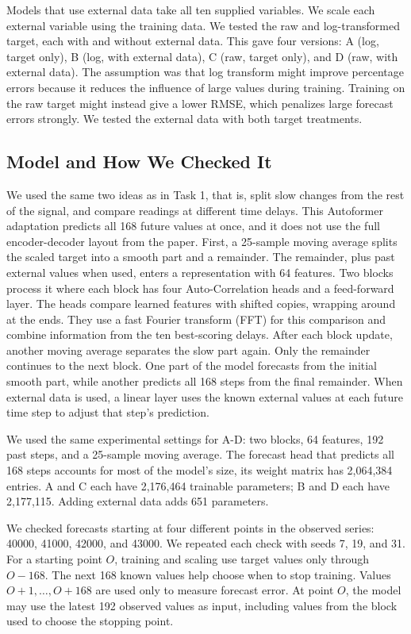 \documentclass[11pt,a4paper]{article}
\begin{document}
Models that use external data take all ten supplied variables. We scale each external variable using
the training data. We tested the raw and log-transformed target, each with and without external data.
This gave four versions: A (log, target only), B (log, with external data), C (raw, target only),
and D (raw, with external data). The assumption was that log transform might improve
percentage errors because it reduces the influence of large values during
training. Training on the raw target might instead give a lower RMSE, which
penalizes large forecast errors strongly. We tested the external data with
both target treatments.

\subsection*{Model and How We Checked It}

We used the same two ideas as in Task 1, that is, split slow changes from the rest of
the signal, and compare readings at different time delays. This Autoformer
adaptation predicts all 168 future values at once, and it does not use the full
encoder-decoder layout from the paper. First, a 25-sample moving average
splits the scaled target into a smooth part and a remainder. The remainder,
plus past external values when used, enters a representation with 64 features.
Two blocks process it where each block has four Auto-Correlation heads and a
feed-forward layer. The heads compare learned features with shifted copies,
wrapping around at the ends. They use a fast Fourier transform (FFT) for this
comparison and combine information from the ten best-scoring delays. After
each block update, another moving average separates the slow part again. Only
the remainder continues to the next block. One part of the model forecasts
from the initial smooth part, while another predicts all 168 steps from the
final remainder. When external data is used, a linear layer uses the known external 
values at each future time step to adjust that step’s prediction.

We used the same experimental settings for A-D: two blocks, 64 features, 192
past steps, and a 25-sample moving average. The forecast head that predicts all 168 steps 
accounts for most of the model's size, its weight matrix has 2,064,384 entries. A and C each have
2,176,464 trainable parameters; B and D each have 2,177,115. Adding external
data adds 651 parameters. 

We checked forecasts starting at four different points in the observed series: 40000,
41000, 42000, and 43000. We repeated each check with seeds 7, 19, and 31.
For a starting point $O$, training and scaling use target values only through
$O-168$. The next 168 known values help choose when to stop training.
Values $O+1,\ldots,O+168$ are used only to measure forecast error. At point
$O$, the model may use the latest 192 observed values as input, including
values from the block used to choose the stopping point.  
\end{document}
